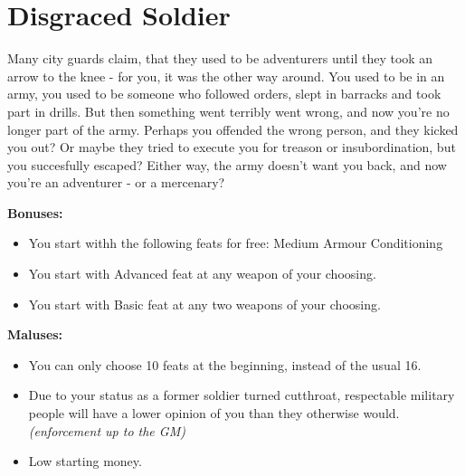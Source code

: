 \section{Disgraced Soldier}
Many city guards claim, that they used to be adventurers until they took an arrow to the knee - for you, it was the other way around. You used to be in an army, you used to be someone who followed orders, slept in barracks and took part in drills. But then something went terribly went wrong, and now you're no longer part of the army. Perhaps you offended the wrong person, and they kicked you out? Or maybe they tried to execute you for treason or insubordination, but you succesfully escaped? Either way, the army doesn't want you back, and now you're an adventurer - or a mercenary? 


\textbf{Bonuses:}
\begin{itemize}
	\item You start withh the following feats for free: Medium Armour Conditioning
	\item You start with Advanced feat at any weapon of your choosing.
	\item You start with Basic feat at any two weapons of your choosing.
\end{itemize}


\textbf{Maluses:}
\begin{itemize}
	\item You can only choose 10 feats at the beginning, instead of the usual 16.
	\item Due to your status as a former soldier turned cutthroat, respectable military people will have a lower opinion of you than they otherwise would. \textit{(enforcement up to the GM)}
	\item Low starting money.
\end{itemize}
